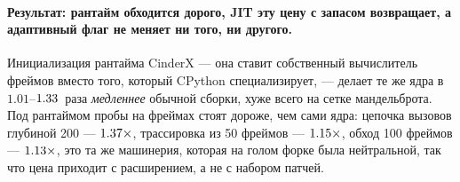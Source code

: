 \paragraph{Результат: рантайм обходится дорого, JIT эту цену с запасом возвращает, а адаптивный флаг не
меняет ни того, ни другого.} Инициализация рантайма CinderX --- она ставит собственный вычислитель
фреймов вместо того, который CPython специализирует, --- делает те же ядра в $1.01$--$\meas{ratio:b6_cinderx-fork_cinderx:mandelbrot/fork_cinderx|b6_cinderx-stock:mandelbrot/stock}{1.33}$~раза
\emph{медленнее} обычной сборки, хуже всего на сетке мандельброта. Под рантаймом пробы на фреймах
стоят дороже, чем сами ядра: цепочка вызовов глубиной 200 --- $\meas{ratio:b6_cinderx-fork_cinderx:call_depth_200/fork_cinderx|b6_cinderx-stock:call_depth_200/stock}{1.37}\times$, трассировка из 50
фреймов --- $\meas{ratio:b6_cinderx-fork_cinderx:traceback_depth_50/fork_cinderx|b6_cinderx-stock:traceback_depth_50/stock}{1.15}\times$, обход 100 фреймов --- $\meas{ratio:b6_cinderx-fork_cinderx:frame_walk_depth_100/fork_cinderx|b6_cinderx-stock:frame_walk_depth_100/stock}{1.13}\times$, это та же машинерия, которая на голом
форке была нейтральной, так что цена приходит с расширением, а не с набором патчей.

